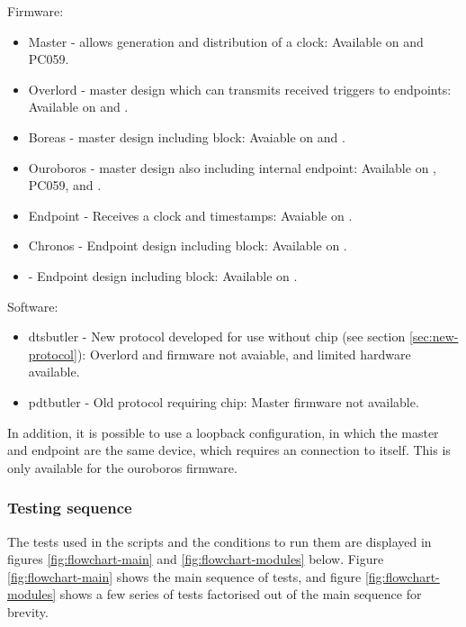 \documentclass{dune}
\begin{document}
Firmware:
\begin{itemize}
    \item Master - allows generation and distribution of a clock: Available on  and PC059.
    \item Overlord - master design which can transmits received triggers to endpoints: Available on  and .
    \item Boreas - master design including  block: Avaiable on  and .
    \item Ouroboros - master design also including internal endpoint: Available on , PC059, and .
    \item Endpoint - Receives a clock and timestamps: Avaiable on .
    \item Chronos - Endpoint design including  block: Available on .
    \item {} - Endpoint design including  block: Available on .
\end{itemize}

Software:
\begin{itemize}
    \item dtsbutler - New protocol developed for use without  chip (see section \ref{sec:new-protocol}): Overlord and  firmware not avaiable, and limited hardware available.
    \item pdtbutler - Old protocol requiring  chip: Master firmware not available.
\end{itemize}

In addition, it is possible to use a loopback configuration, in which the master and endpoint are the same device, which requires an  connection to itself.
This is only available for the ouroboros firmware.

\subsubsection{Testing sequence}
\label{sec:flowchart}
The tests used in the scripts and the conditions to run them are displayed in figures \ref{fig:flowchart-main} and \ref{fig:flowchart-modules} below.
Figure \ref{fig:flowchart-main} shows the main sequence of tests, and figure \ref{fig:flowchart-modules} shows a few series of tests factorised out of the main sequence for brevity.
\end{document}

